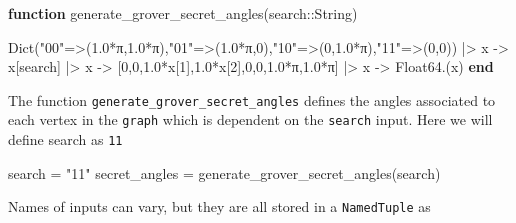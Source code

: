 \documentclass[
]{article}
\newenvironment{Shaded}{}{}
\newcommand{\ConstantTok}[1]{\textcolor[rgb]{0.53,0.00,0.00}{#1}}
\newcommand{\DataTypeTok}[1]{\textcolor[rgb]{0.56,0.13,0.00}{#1}}
\newcommand{\FloatTok}[1]{\textcolor[rgb]{0.25,0.63,0.44}{#1}}
\newcommand{\FunctionTok}[1]{\textcolor[rgb]{0.02,0.16,0.49}{#1}}
\newcommand{\KeywordTok}[1]{\textcolor[rgb]{0.00,0.44,0.13}{\textbf{#1}}}
\newcommand{\NormalTok}[1]{#1}
\newcommand{\OperatorTok}[1]{\textcolor[rgb]{0.40,0.40,0.40}{#1}}
\newcommand{\StringTok}[1]{\textcolor[rgb]{0.25,0.44,0.63}{#1}}
\begin{document}
\begin{Shaded}
\begin{Highlighting}[]
    \KeywordTok{function} \FunctionTok{generate\_grover\_secret\_angles}\NormalTok{(search}\OperatorTok{::}\DataTypeTok{String}\NormalTok{)}

        \FunctionTok{Dict}\NormalTok{(}\StringTok{"00"}\OperatorTok{=\textgreater{}}\NormalTok{(}\FloatTok{1.0}\OperatorTok{*}\ConstantTok{π}\NormalTok{,}\FloatTok{1.0}\OperatorTok{*}\ConstantTok{π}\NormalTok{),}\StringTok{"01"}\OperatorTok{=\textgreater{}}\NormalTok{(}\FloatTok{1.0}\OperatorTok{*}\ConstantTok{π}\NormalTok{,}\FloatTok{0}\NormalTok{),}\StringTok{"10"}\OperatorTok{=\textgreater{}}\NormalTok{(}\FloatTok{0}\NormalTok{,}\FloatTok{1.0}\OperatorTok{*}\ConstantTok{π}\NormalTok{),}\StringTok{"11"}\OperatorTok{=\textgreater{}}\NormalTok{(}\FloatTok{0}\NormalTok{,}\FloatTok{0}\NormalTok{)) }\OperatorTok{|\textgreater{}}
\NormalTok{        x }\OperatorTok{{-}\textgreater{}}\NormalTok{ x[search] }\OperatorTok{|\textgreater{}}
\NormalTok{        x }\OperatorTok{{-}\textgreater{}}\NormalTok{ [}\FloatTok{0}\NormalTok{,}\FloatTok{0}\NormalTok{,}\FloatTok{1.0}\OperatorTok{*}\NormalTok{x[}\FloatTok{1}\NormalTok{],}\FloatTok{1.0}\OperatorTok{*}\NormalTok{x[}\FloatTok{2}\NormalTok{],}\FloatTok{0}\NormalTok{,}\FloatTok{0}\NormalTok{,}\FloatTok{1.0}\OperatorTok{*}\ConstantTok{π}\NormalTok{,}\FloatTok{1.0}\OperatorTok{*}\ConstantTok{π}\NormalTok{] }\OperatorTok{|\textgreater{}}
\NormalTok{        x }\OperatorTok{{-}\textgreater{}} \FunctionTok{Float64}\NormalTok{.(x)}
    \KeywordTok{end}
\end{Highlighting}
\end{Shaded}

The function \texttt{generate\_grover\_secret\_angles} defines the
angles associated to each vertex in the \texttt{graph} which is
dependent on the \texttt{search} input. Here we will define search as
\texttt{11}

\begin{Shaded}
\begin{Highlighting}[]
\NormalTok{    search }\OperatorTok{=} \StringTok{"11"}
\NormalTok{    secret\_angles }\OperatorTok{=} \FunctionTok{generate\_grover\_secret\_angles}\NormalTok{(search)}
\end{Highlighting}
\end{Shaded}

Names of inputs can vary, but they are all stored in a
\texttt{NamedTuple} as
\end{document}
